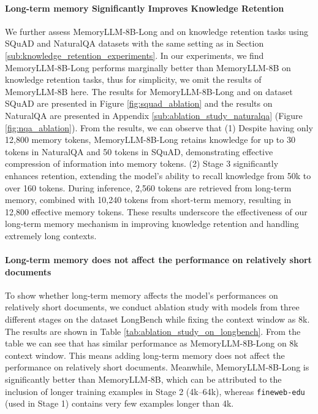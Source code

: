 \vspace{-5pt}
\paragraph{Long-term memory Significantly Improves Knowledge Retention}
We further assess MemoryLLM-8B-Long and \ours on knowledge retention tasks using SQuAD and NaturalQA datasets with the same setting as in Section \ref{sub:knowledge_retention_experiments}. 
In our experiments, we find MemoryLLM-8B-Long performs marginally better than MemoryLLM-8B on knowledge retention tasks, thus for simplicity, we omit the results of MemoryLLM-8B here.
The results for MemoryLLM-8B-Long and \ours on dataset SQuAD are presented in Figure \ref{fig:squad_ablation} and the results on NaturalQA are presented in Appendix \ref{sub:ablation_study_naturalqa} (Figure \ref{fig:nqa_ablation}). 
From the results, we can observe that (1) Despite having only 12,800 memory tokens, MemoryLLM-8B-Long retains knowledge for up to 30 tokens in NaturalQA and 50 tokens in SQuAD, demonstrating effective compression of information into memory tokens. (2) Stage 3 significantly enhances retention, extending the model's ability to recall knowledge from 50k to over 160 tokens. During inference, 2,560 tokens are retrieved from long-term memory, combined with 10,240 tokens from short-term memory, resulting in 12,800 effective memory tokens. These results underscore the effectiveness of our long-term memory mechanism in improving knowledge retention and handling extremely long contexts. 

\vspace{-5pt}
\paragraph{Long-term memory does not affect the performance on relatively short documents}
To show whether long-term memory affects the model's performances on relatively short documents, we conduct ablation study with models from three different stages on the dataset LongBench while fixing the context window as 8k. The results are shown in Table \ref{tab:ablation_study_on_longbench}. From the table we can see that \ours has similar performance as MemoryLLM-8B-Long on 8k context window. This means adding long-term memory does not affect the performance on relatively short documents. Meanwhile, MemoryLLM-8B-Long is significantly better than MemoryLLM-8B, which can be attributed to the inclusion of longer training examples in Stage 2 (4k–64k), whereas \texttt{fineweb-edu} (used in Stage 1) contains very few examples longer than 4k.

